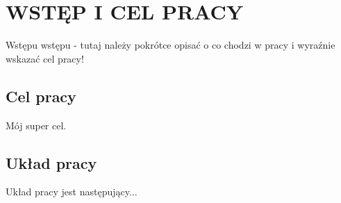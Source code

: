 \chapter{WSTĘP I CEL PRACY}
\label{chap:introduction}
Wstępu wstępu - tutaj należy pokrótce opisać o co chodzi w pracy i wyraźnie wskazać cel pracy!
\section{Cel pracy}
Mój super cel. 
\section{Układ pracy}
Układ pracy jest następujący...

